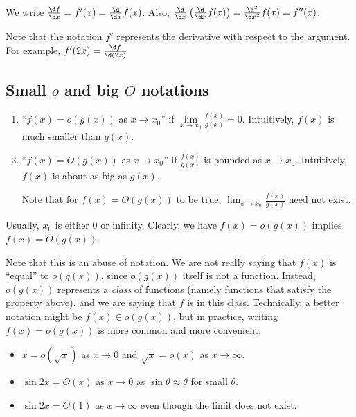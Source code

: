 \documentclass[a4paper]{article}
\begin{document}
{\begin{notation}
  We write $\frac{\d f}{\d x} = f'(x) = \frac{\d}{\d x} f(x)$. Also, $\frac{\d}{\d x}\left(\frac{\d}{\d x} f(x)\right) = \frac{\d^2}{\d x^2} f(x) = f''(x)$.

  Note that the notation $f'$ represents the derivative with respect to the argument. For example, $f'(2x) = \frac{\d f}{\d (2x)}$
\end{notation}

\subsection{Small \texorpdfstring{$o$}{o} and big \texorpdfstring{$O$}{O} notations}
\begin{defi}\leavevmode
  \begin{enumerate}
    \item ``$f(x) = o(g(x))$ as $x\to x_0$'' if $\lim\limits_{x\to x_0} \frac{f(x)}{g(x)} = 0$. Intuitively, $f(x)$ is much smaller than $g(x)$.
    \item ``$f(x) = O(g(x))$ as $x\to x_0$'' if $\frac{f(x)}{g(x)}$ is bounded as $x\to x_0$. Intuitively, $f(x)$ is about as big as $g(x)$.

      Note that for $f(x) = O(g(x))$ to be true, $\displaystyle \lim_{x\to x_0} \frac{f(x)}{g(x)}$ need not exist.
  \end{enumerate}
  Usually, $x_0$ is either $0$ or infinity. Clearly, we have $f(x)=o(g(x))$ implies $f(x) = O(g(x))$.
\end{defi}
Note that this is an abuse of notation. We are not really saying that $f(x)$ is ``equal'' to $o(g(x))$, since $o(g(x))$ itself is not a function. Instead, $o(g(x))$ represents a \emph{class} of functions (namely functions that satisfy the property above), and we are saying that $f$ is in this class. Technically, a better notation might be $f(x) \in o(g(x))$, but in practice, writing $f(x) = o(g(x))$ is more common and more convenient.

\begin{eg}\leavevmode
  \begin{itemize}
    \item $x=o(\sqrt{x})$ as $x\to 0$ and $\sqrt{x} = o(x)$ as $x\to \infty$.
    \item $\sin 2x = O(x)$ as $x\to 0$ as $\sin \theta \approx \theta$ for small $\theta$.
    \item $\sin 2x = O(1)$ as $x\to \infty$ even though the limit does not exist.
  \end{itemize}
\end{eg}

}
\end{document}
